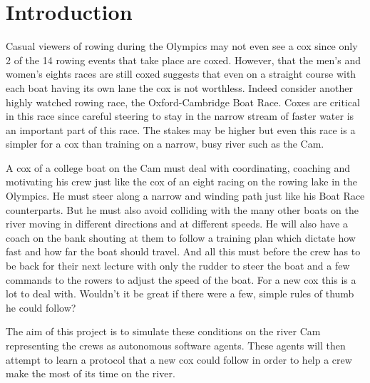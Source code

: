 \chapter{Introduction}
Casual viewers of rowing during the Olympics may not even see a cox since only 2 of the 14 rowing events that take place are coxed. However, that the men's and women's eights races are still coxed suggests that even on a straight course with each boat having its own lane the cox is not worthless. Indeed consider another highly watched rowing race, the Oxford-Cambridge Boat Race. Coxes are critical in this race since careful steering to stay in the narrow stream of faster water is an important part of this race. The stakes may be higher but even this race is a simpler for a cox than training on a narrow, busy river such as the Cam.

A cox of a college boat on the Cam must deal with coordinating, coaching and motivating his crew just like the cox of an eight racing on the rowing lake in the Olympics. He must steer along a narrow and winding path just like his Boat Race counterparts. But he must also avoid colliding with the many other boats on the river moving in different directions and at different speeds. He will also have a coach on the bank shouting at them to follow a training plan which dictate how fast and how far the boat should travel. And all this must before the crew has to be back for their next lecture with only the rudder to steer the boat and a few commands to the rowers to adjust the speed of the boat. For a new cox this is a lot to deal with. Wouldn't it be great if there were a few, simple rules of thumb he could follow?

The aim of this project is to simulate these conditions on the river Cam representing the crews as autonomous software agents. These agents will then attempt to learn a protocol that a new cox could follow in order to help a crew make the most of its time on the river.